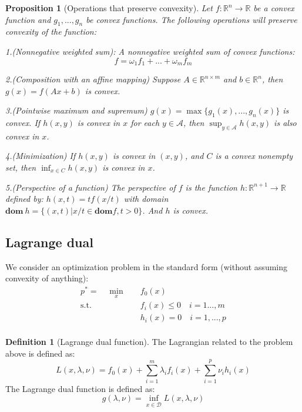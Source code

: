 \documentclass[
]{book}
\newtheorem{proposition}{Proposition}[chapter]
\theoremstyle{definition}
\newtheorem{definition}{Definition}[chapter]
\theoremstyle{definition}
\theoremstyle{definition}
\theoremstyle{definition}
\theoremstyle{remark}
\begin{document}
\begin{proposition}[Operations that preserve convexity]
\protect\hypertarget{prp:preservecvx}{}\label{prp:preservecvx}Let \(f:\mathbb{R}^n\to\mathbb{R}\) be a convex function and \(g_1,...,g_n\) be convex functions. The following operations will preserve convexity of the function:

1.(Nonnegative weighted sum): A nonnegative weighted sum of convex functions: \[f = \omega_1f_1 + ... +\omega_mf_m\]

2.(Composition with an affine mapping) Suppose \(A\in \mathbb{R}^{n\times m}\) and \(b\in \mathbb{R}^n\), then \(g(x) = f(Ax+b)\) is convex.

3.(Pointwise maximum and supremum) \(g(x) = \max\{g_1(x),...,g_n(x)\}\) is convex. If \(h(x,y)\) is convex in \(x\) for each \(y\in\mathcal{A}\), then \(\sup_{y\in\mathcal{A}} h(x,y)\) is also convex in \(x\).

4.(Minimization) If \(h(x,y)\) is convex in \((x,y)\), and \(C\) is a convex nonempty set, then \(\inf_{x\in C} h(x,y)\) is convex in \(x\).

5.(Perspective of a function) The perspective of \(f\) is the function \(h:\mathbb{R}^{n+1}\to\mathbb{R}\) defined by: \(h(x,t) = tf(x/t)\) with domain \(\textbf{dom}\ h=\{(x,t)|x/t\in\textbf{dom} f,t>0\}\). And \(h\) is convex.
\end{proposition}

\hypertarget{lagrange-dual}{%
\subsection{Lagrange dual}\label{lagrange-dual}}

We consider an optimization problem in the standard form (without assuming convexity of anything):
\begin{equation}
\begin{aligned}
p^* = \quad \min_{x} \quad & f_0(x)\\
\textrm{s.t.} \quad & f_i(x)\leq 0\quad i=1...,m\\
  & h_i(x) = 0\quad i=1,...,p   \\
\end{aligned}
\end{equation}

\begin{definition}[Lagrange dual function]
\protect\hypertarget{def:defdualfunc}{}\label{def:defdualfunc}The Lagrangian related to the problem above is defined as: \[L(x,\lambda,\nu)=f_0(x)+\sum_{i=1}^m\lambda_if_i(x)+\sum_{i=1}^p\nu_ih_i(x)\]
The Lagrange dual function is defined as: \[g(\lambda,\nu) = \inf_{x\in\mathcal{D}}L(x,\lambda,\nu)\]
\end{definition}
\end{document}
